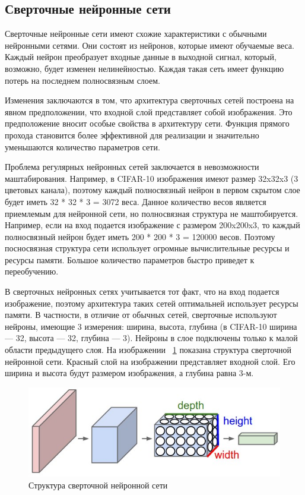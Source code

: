 \documentclass[a4paper,english,russian]{G2-105}
\begin{document}
\subsection{Сверточные нейронные сети}
\par Сверточные нейронные сети имеют схожие характеристики с обычными нейронными сетями. Они состоят из нейронов, которые имеют обучаемые веса. Каждый нейрон преобразует входные данные в выходной сигнал, который, возможно, будет изменен нелинейностью. Каждая такая сеть имеет функцию потерь на последнем полносвязным слоем.
\par Изменения заключаются в том, что архитектура сверточных сетей построена на явном предположении, что входной слой представляет собой изображения. Это предположение вносит особые свойства в архитектуру сети. Функция прямого прохода становится более эффективной для реализации и значительно уменьшаются количество параметров сети.
\par Проблема регулярных нейронных сетей заключается в невозможности маштабирования. Например, в CIFAR-10 изображения имеют размер 32x32x3 (3 цветовых канала), поэтому каждый полносвязный нейрон в первом скрытом слое будет иметь 32 * 32 * 3 = 3072 веса. Данное количество весов является приемлемым для нейронной сети, но полносвязная структура не маштобируется. Например, если на вход подается изображение с размером 200x200x3, то каждый полносвязный нейрон будет иметь 200 * 200 * 3 = 120000 весов. Поэтому посносвязная структура сети использует огромные вычислительные ресурсы и ресурсы памяти. Большое количество параметров быстро приведет к переобучению.
\par В сверточных нейронных сетях учитывается тот факт, что на вход подается изображение, поэтому архитектура таких сетей оптимальней использует ресурсы памяти. В частности, в отличие от обычных сетей, сверточные используют нейроны, имеющие 3 измерения: ширина, высота, глубина (в CIFAR-10 ширина --- 32, высота --- 32, глубина --- 3). Нейроны в слое подключены только к малой области предыдущего слоя. На изображении ~\ref{convnn} показана структура сверточной нейронной сети. Красный слой на изображении представляет входной слой. Его ширина и высота будут размером изображения, а глубина равна 3-м.
\begin{figure}
    \includegraphics[width=\linewidth]{convnn.png}
    \caption{Структура сверточной нейронной сети}
	\label{convnn}
\end{figure}
\end{document}
